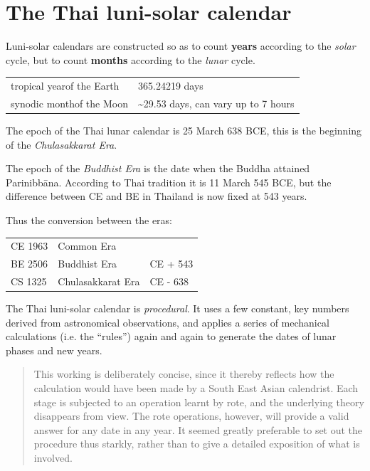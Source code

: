 \documentclass[11pt,oneside]{memoir-article}
\begin{document}
\clearpage

\chapter{The Thai luni-solar calendar}
\label{sec-4}

Luni-solar calendars are constructed so as to count \textbf{years} according to the
\emph{solar} cycle, but to count \textbf{months} according to the \emph{lunar} cycle.

\begin{center}
\begin{tabular}{ll}
tropical year\footnotemark\space of the Earth & 365.24219 days\\
synodic month\footnotemark\space of the Moon & \textasciitilde{}29.53 days, can vary up to 7 hours\\
\end{tabular}
\end{center}

The epoch of the Thai lunar calendar is 25 March 638 BCE, this is the beginning
of the \emph{Chulasakkarat Era}.\autocite{eade1995calendrical}

The epoch of the \emph{Buddhist Era} is the date when the Buddha attained
Parinibbāna. According to Thai tradition it is 11 March 545 BCE, but the
difference between CE and BE in Thailand is now fixed at 543
years.\autocite{eade1995calendrical}

Thus the conversion between the eras:

\begin{center}
\begin{tabular}{lll}
CE 1963 & Common Era & \\
BE 2506 & Buddhist Era & CE + 543\\
CS 1325 & Chulasakkarat Era & CE - 638\\
\end{tabular}
\end{center}

The Thai luni-solar calendar is \emph{procedural}. It uses a few constant,
key numbers derived from astronomical observations, and applies a
series of mechanical calculations (i.e. the ``rules'') again and again
to generate the dates of lunar phases and new years.

\begin{quote}
This working is deliberately concise, since it thereby reflects how
the calculation would have been made by a South East Asian calendrist.
Each stage is subjected to an operation learnt by rote, and the
underlying theory disappears from view. The rote operations, however,
will provide a valid answer for any date in any year. It seemed
greatly preferable to set out the procedure thus starkly, rather than
to give a detailed exposition of what is involved.\autocite{eade-interpolation}
\end{quote}
\end{document}

